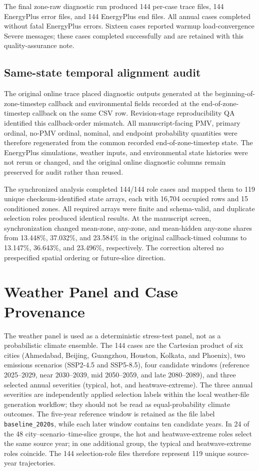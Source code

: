 \documentclass[11pt]{article}
\begin{document}
The final zone-raw diagnostic run produced 144 per-case trace files, 144 EnergyPlus error files, and 144 EnergyPlus end files. All annual cases completed without fatal EnergyPlus errors. Sixteen cases reported warmup load-convergence Severe messages; these cases completed successfully and are retained with this quality-assurance note.

\subsection*{Same-state temporal alignment audit}

The original online trace placed diagnostic outputs generated at the beginning-of-zone-timestep callback and environmental fields recorded at the end-of-zone-timestep callback on the same CSV row. Revision-stage reproducibility QA identified this callback-order mismatch. All manuscript-facing PMV, primary ordinal, no-PMV ordinal, nominal, and endpoint probability quantities were therefore regenerated from the common recorded end-of-zone-timestep state. The EnergyPlus simulations, weather inputs, and environmental state histories were not rerun or changed, and the original online diagnostic columns remain preserved for audit rather than reused.

The synchronized analysis completed 144/144 role cases and mapped them to 119 unique checksum-identified state arrays, each with 16{,}704 occupied rows and 15 conditioned zones. All required arrays were finite and schema-valid, and duplicate selection roles produced identical results. At the manuscript screen, synchronization changed mean-zone, any-zone, and mean-hidden any-zone shares from 13.448\%, 37.032\%, and 23.584\% in the original callback-timed columns to 13.147\%, 36.643\%, and 23.496\%, respectively. The correction altered no prespecified spatial ordering or future-slice direction.

\section{Weather Panel and Case Provenance}

The weather panel is used as a deterministic stress-test panel, not as a probabilistic climate ensemble. The 144 cases are the Cartesian product of six cities (Ahmedabad, Beijing, Guangzhou, Houston, Kolkata, and Phoenix), two emissions scenarios (SSP2-4.5 and SSP5-8.5), four candidate windows (reference 2025--2029, near 2030--2039, mid 2050--2059, and late 2080--2089), and three selected annual severities (typical, hot, and heatwave-extreme). The three annual severities are independently applied selection labels within the local weather-file generation workflow; they should not be read as equal-probability climate outcomes. The five-year reference window is retained as the file label \texttt{baseline\_2020s}, while each later window contains ten candidate years. In 24 of the 48 city--scenario--time-slice groups, the hot and heatwave-extreme roles select the same source year; in one additional group, the typical and heatwave-extreme roles coincide. The 144 selection-role files therefore represent 119 unique source-year trajectories.
\end{document}
